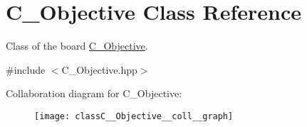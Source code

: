 \hypertarget{classC__Objective}{}\section{C\+\_\+\+Objective Class Reference}
\label{classC__Objective}


Class of the board \hyperlink{classC__Objective}{C\+\_\+\+Objective}.  




{\ttfamily \#include $<$C\+\_\+\+Objective.\+hpp$>$}



Collaboration diagram for C\+\_\+\+Objective\+:
\nopagebreak
\begin{figure}[H]
\begin{center}
\leavevmode
\texttt{[image: classC\_\_Objective\_\_coll\_\_graph]}
\end{center}
\end{figure}
